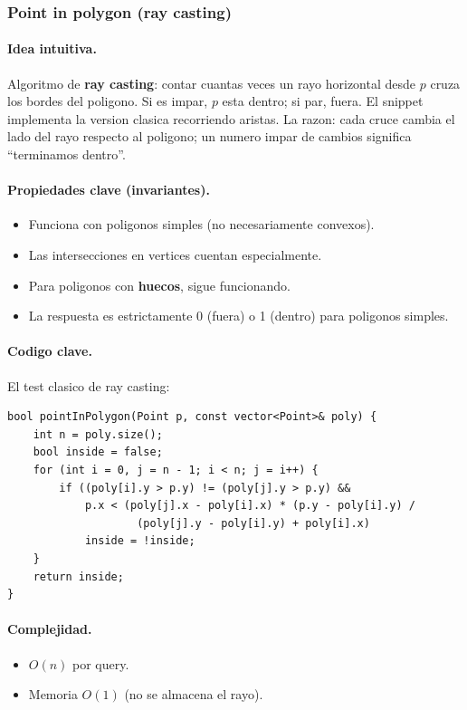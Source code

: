 ﻿\subsubsection{Point in polygon (ray casting)}

\paragraph{Idea intuitiva.}
Algoritmo de \textbf{ray casting}: contar cuantas veces un rayo horizontal desde $p$ cruza los bordes del poligono. Si es impar, $p$ esta dentro; si par, fuera. El snippet implementa la version clasica recorriendo aristas. La razon: cada cruce cambia el lado del rayo respecto al poligono; un numero impar de cambios significa ``terminamos dentro''.

\paragraph{Propiedades clave (invariantes).}
\begin{itemize}\setlength\itemsep{0pt}
	\item Funciona con poligonos simples (no necesariamente convexos).
	\item Las intersecciones en vertices cuentan especialmente.
	\item Para poligonos con \textbf{huecos}, sigue funcionando.
	\item La respuesta es estrictamente 0 (fuera) o 1 (dentro) para poligonos simples.
\end{itemize}

\paragraph{Codigo clave.}
El test clasico de ray casting:
\begin{verbatim}
bool pointInPolygon(Point p, const vector<Point>& poly) {
    int n = poly.size();
    bool inside = false;
    for (int i = 0, j = n - 1; i < n; j = i++) {
        if ((poly[i].y > p.y) != (poly[j].y > p.y) &&
            p.x < (poly[j].x - poly[i].x) * (p.y - poly[i].y) /
                    (poly[j].y - poly[i].y) + poly[i].x)
            inside = !inside;
    }
    return inside;
}
\end{verbatim}

\paragraph{Complejidad.}
\begin{itemize}\setlength\itemsep{0pt}
	\item $O(n)$ por query.
	\item Memoria $O(1)$ (no se almacena el rayo).
\end{itemize}


